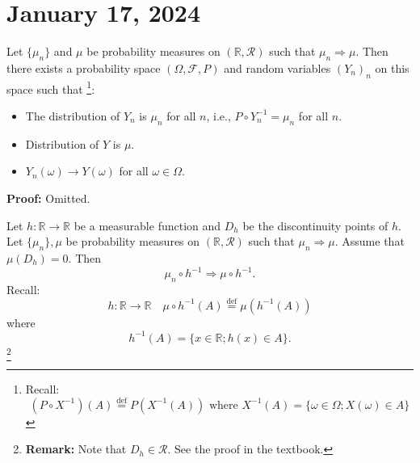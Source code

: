 \section{January 17, 2024}

\begin{theorem}
Let \( \{\mu_n\} \) and \( \mu \) be probability measures on \( (\mathbb{R}, \mathcal{R}) \) such that \( \mu_n \Rightarrow \mu \). Then there exists a probability space \( (\Omega, \mathcal{F}, P) \) and random variables \( (Y_n)_n \) on this space such that
\footnote{Recall:
\[ (P \circ X^{-1})(A) \stackrel{\text{def}}{=} P(X^{-1}(A)) \text{ where } X^{-1}(A) = \{\omega \in \Omega; X(\omega) \in A\} \]}:
\begin{itemize}
    \item The distribution of \( Y_n \) is \( \mu_n \) for all \( n \), i.e., \( P \circ Y_n^{-1} = \mu_n \) for all \( n \).
    \item Distribution of \( Y \) is \( \mu \).
    \item \( Y_n(\omega) \rightarrow Y(\omega) \) for all \( \omega \in \Omega \).
\end{itemize}

\end{theorem}
\textbf{Proof:} Omitted.


\begin{theorem}
Let \( h: \mathbb{R} \to \mathbb{R} \) be a measurable function and \( D_h \) be the discontinuity points of \( h \). Let \( \{\mu_n\}, \mu \) be probability measures on \( (\mathbb{R}, \mathcal{R}) \) such that \( \mu_n \Rightarrow \mu \). Assume that \( \mu(D_h) = 0 \). Then 
\[ \mu_n \circ h^{-1} \Rightarrow \mu \circ h^{-1}. \]
Recall:
\[ h: \mathbb{R} \to \mathbb{R} \quad \mu \circ h^{-1}(A) \stackrel{\text{def}}{=} \mu(h^{-1}(A)) \]
where 
\[ h^{-1}(A) = \{ x \in \mathbb{R}; h(x) \in A \}. \]\footnote{
\textbf{Remark:} Note that \( D_h \in \mathcal{R} \). See the proof in the textbook.}
\end{theorem}
